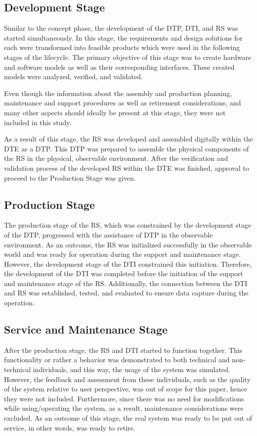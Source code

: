 \documentclass[conference]{IEEEtran}
\begin{document}
    \subsection{Development Stage}
    Similar to the concept phase, the development of the  DTP, DTI, and RS was started simultaneously. In this stage, the requirements and design solutions for each were transformed 
    into feasible products which were used in the following stages of the lifecycle. The primary objective of this stage was to create hardware and software models as well as their corresponding interfaces. 
    These created models were analyzed, verified, and validated. 



    Even though the information about the assembly and production planning, maintenance and support procedures as well as retirement considerations, and many other aspects should ideally be present 
    at this stage, they were not included in this study. 

    As a result of this stage, the RS was developed and assembled digitally within the DTE as a DTP. This DTP was prepared to assemble the physical components of the RS in the physical, observable environment.  
    After the verification and validation process of the developed RS within the DTE was finished, approval to proceed to the Production Stage was given.

    \subsection{Production Stage}
    The production stage of the RS, which was constrained by the development stage of the DTP, progressed with the assistance of  DTP in the observable environment.  As an outcome, the RS was initialized successfully in the observable world and was ready for operation during the support and maintenance stage. However, the development stage of the DTI constrained this initiation. Therefore, the development of the DTI was completed before the initiation of the support and maintenance stage of the RS.  
    Additionally, the connection between the DTI and RS was established, tested, and evaluated to ensure data capture during the operation.

    \subsection{Service and Maintenance Stage}
    After the production stage, the RS and DTI started to function together. This functionality or rather a behavior was demonstrated to both technical and non-technical individuals, 
    and this way, the usage of the system was simulated. However, the feedback and assessment from these individuals, such as the quality of the system relative to user perspective,
    was out of scope for this paper, hence they were not included.  Furthermore, since there was no need for modifications while using/operating the system, 
    as a result, maintenance considerations were excluded. As an outcome of this stage, the real system was ready to be put out of service, in other words, was ready to retire.
\end{document}
